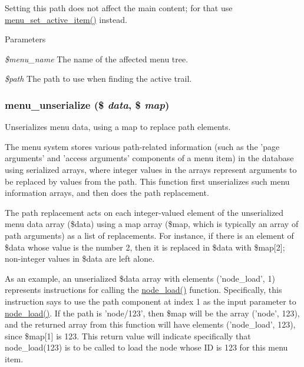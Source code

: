 Setting this path does not affect the main content; for that use \hyperlink{group__menu_gacdd22102c2ba6545645ae34be563d1d4}{menu\_\-set\_\-active\_\-item()} instead.


\begin{DoxyParams}{Parameters}
\item[{\em \$menu\_\-name}]The name of the affected menu tree. \item[{\em \$path}]The path to use when finding the active trail. \end{DoxyParams}
\hypertarget{group__menu_ga3f9fe4d53dc9d9c3724f956f1465b5be}{
\subsubsection[{menu\_\-unserialize}]{\setlength{\rightskip}{0pt plus 5cm}menu\_\-unserialize (\$ {\em data}, \/  \$ {\em map})}}
\label{group__menu_ga3f9fe4d53dc9d9c3724f956f1465b5be}
Unserializes menu data, using a map to replace path elements.

The menu system stores various path-\/related information (such as the 'page arguments' and 'access arguments' components of a menu item) in the database using serialized arrays, where integer values in the arrays represent arguments to be replaced by values from the path. This function first unserializes such menu information arrays, and then does the path replacement.

The path replacement acts on each integer-\/valued element of the unserialized menu data array (\$data) using a map array (\$map, which is typically an array of path arguments) as a list of replacements. For instance, if there is an element of \$data whose value is the number 2, then it is replaced in \$data with \$map\mbox{[}2\mbox{]}; non-\/integer values in \$data are left alone.

As an example, an unserialized \$data array with elements ('node\_\-load', 1) represents instructions for calling the \hyperlink{node_8module_a492ddfc12843e71242bb484a44e51a19}{node\_\-load()} function. Specifically, this instruction says to use the path component at index 1 as the input parameter to \hyperlink{node_8module_a492ddfc12843e71242bb484a44e51a19}{node\_\-load()}. If the path is 'node/123', then \$map will be the array ('node', 123), and the returned array from this function will have elements ('node\_\-load', 123), since \$map\mbox{[}1\mbox{]} is 123. This return value will indicate specifically that node\_\-load(123) is to be called to load the node whose ID is 123 for this menu item.


